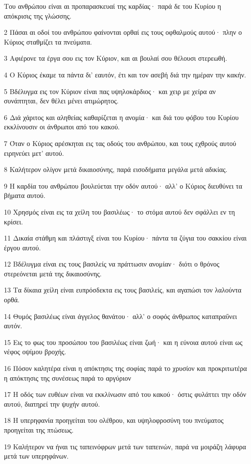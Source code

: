 \par Του ανθρώπου είναι αι προπαρασκευαί της καρδίας· παρά δε του Κυρίου η απόκρισις της γλώσσης.
\par 2 Πάσαι αι οδοί του ανθρώπου φαίνονται ορθαί εις τους οφθαλμούς αυτού· πλην ο Κύριος σταθμίζει τα πνεύματα.
\par 3 Αφιέρονε τα έργα σου εις τον Κύριον, και αι βουλαί σου θέλουσι στερεωθή.
\par 4 Ο Κύριος έκαμε τα πάντα δι' εαυτόν, έτι και τον ασεβή διά την ημέραν την κακήν.
\par 5 Βδέλυγμα εις τον Κύριον είναι πας υψηλοκάρδιος· και χειρ με χείρα αν συνάπτηται, δεν θέλει μένει ατιμώρητος.
\par 6 Διά χάριτος και αληθείας καθαρίζεται η ανομία· και διά του φόβου του Κυρίου εκκλίνουσιν οι άνθρωποι από του κακού.
\par 7 Όταν ο Κύριος αρέσκηται εις τας οδούς του ανθρώπου, και τους εχθρούς αυτού ειρηνεύει μετ' αυτού.
\par 8 Καλήτερον ολίγον μετά δικαιοσύνης, παρά εισοδήματα μεγάλα μετά αδικίας.
\par 9 Η καρδία του ανθρώπου βουλεύεται την οδόν αυτού· αλλ' ο Κύριος διευθύνει τα βήματα αυτού.
\par 10 Χρησμός είναι εις τα χείλη του βασιλέως· το στόμα αυτού δεν σφάλλει εν τη κρίσει.
\par 11 Δικαία στάθμη και πλάστιγξ είναι του Κυρίου· πάντα τα ζύγια του σακκίου είναι έργου αυτού.
\par 12 Βδέλυγμα είναι εις τους βασιλείς να πράττωσιν ανομίαν· διότι ο θρόνος στερεόνεται μετά της δικαιοσύνης.
\par 13 Τα δίκαια χείλη είναι ευπρόσδεκτα εις τους βασιλείς, και αγαπώσι τον λαλούντα ορθά.
\par 14 Θυμός βασιλέως είναι άγγελος θανάτου· αλλ' ο σοφός άνθρωπος καταπραΰνει αυτόν.
\par 15 Εις το φως του προσώπου του βασιλέως είναι ζωή· και η εύνοια αυτού είναι ως νέφος οψίμου βροχής.
\par 16 Πόσον καλητέρα είναι η απόκτησις της σοφίας παρά το χρυσίον και προκριτωτέρα η απόκτησις της συνέσεως παρά το αργύριον
\par 17 Η οδός των ευθέων είναι να εκκλίνωσιν από του κακού· όστις φυλάττει την οδόν αυτού, διατηρεί την ψυχήν αυτού.
\par 18 Η υπερηφανία προηγείται του ολέθρου, και υψηλοφροσύνη του πνεύματος προηγείται της πτώσεως.
\par 19 Καλήτερον να ήναι τις ταπεινόφρων μετά των ταπεινών, παρά να μοιράζη λάφυρα μετά των υπερηφάνων.
